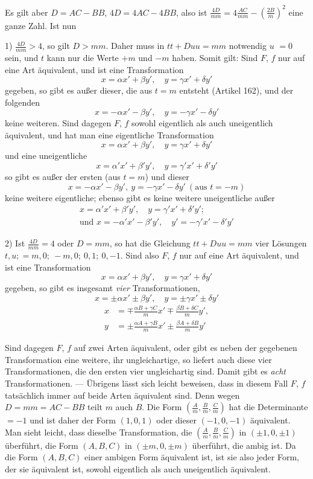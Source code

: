 Es gilt aber $D=AC-BB$, $4D=4AC-4BB$, also ist $\frac{4D}{mm}=4\frac{AC}{mm}-(\frac{2B}{m})^2$ eine ganze Zahl. Ist nun

1) $\frac{4D}{mm}>4$, so gilt $D>mm$. Daher muss in $tt+Duu=mm$ notwendig $u$ $=0$ sein, und $t$ kann nur die Werte $+m$ und $-m$ haben. Somit gilt:
Sind $F$, $f$ nur auf eine Art äquivalent, und ist eine Transformation
\[
x=\alpha x'+\beta y',\quad y=\gamma x'+\delta y'
\]
gegeben, so gibt es außer dieser, die aus $t=m$ entsteht (Artikel 162), und der folgenden
\[
x=-\alpha x'-\beta y',\quad y=-\gamma x'-\delta y'
\]
keine weiteren. Sind dagegen $F$, $f$ sowohl eigentlich als auch uneigentlich äquivalent, und hat man eine eigentliche Transformation
\[
x=\alpha x'+\beta y',\quad y=\gamma x'+\delta y'
\]
und eine uneigentliche
\[
x=\alpha'x'+\beta'y',\quad y=\gamma'x'+\delta'y'
\]
so gibt es außer der ersten (aus $t=m$) und dieser
\[
x=-\alpha x'-\beta y',\ y=-\gamma x'-\delta y'\ (\text{aus }t=-m)
\]
keine weitere eigentliche; ebenso gibt es keine weitere uneigentliche außer
\[
\begin{gathered}
x=\alpha'x'+\beta'y',\quad y=\gamma'x'+\delta'y';\\
\text{und }x=-\alpha'x'-\beta'y',\quad y'=-\gamma'x'-\delta'y'
\end{gathered}
\]

2) Ist $\frac{4D}{mm}=4$ oder $D=mm$, so hat die Gleichung $tt+Duu=mm$ vier Lösungen $t,u;=m,0;\ -m,0;\ 0,1;\ 0,-1$. Sind also $F$, $f$ nur auf eine Art äquivalent, und ist eine Transformation
\[
x=\alpha x'+\beta y',\quad y=\gamma x'+\delta y'
\]
gegeben, so gibt es insgesamt \emph{vier} Transformationen,
\[
x=\pm\alpha x'\pm\beta y',\quad y=\pm\gamma x'\pm\delta y'
\]
\[
\begin{aligned}
x&=\mp\frac{\alpha B+\gamma C}{m}x'\mp\frac{\beta B+\delta C}{m}y',\\
y&=\pm\frac{\alpha A+\gamma B}{m}x'\pm\frac{\beta A+\delta B}{m}y'
\end{aligned}
\]

Sind dagegen $F$, $f$ auf zwei Arten äquivalent, oder gibt es neben der gegebenen Transformation eine weitere, ihr ungleichartige, so liefert auch diese vier Transformationen, die den ersten vier ungleichartig sind. Damit gibt es \emph{acht} Transformationen. --- Übrigens lässt sich leicht beweisen, dass in diesem Fall $F$, $f$ tatsächlich immer auf beide Arten äquivalent sind. Denn wegen $D=mm=AC-BB$ teilt $m$ auch $B$. Die Form $(\frac{A}{m},\frac{B}{m},\frac{C}{m})$ hat die Determinante $=-1$ und ist daher der Form $(1,0,1)$ oder dieser $(-1,0,-1)$ äquivalent.
Man sieht leicht, dass dieselbe Transformation, die $(\frac{A}{m},\frac{B}{m},\frac{C}{m})$ in $(\pm1,0,\pm1)$ überführt, die Form $(A,B,C)$ in $(\pm m,0,\pm m)$ überführt, die ambig ist. Da die Form $(A,B,C)$ einer ambigen Form äquivalent ist, ist sie also jeder Form, der sie äquivalent ist, sowohl eigentlich als auch uneigentlich äquivalent.

